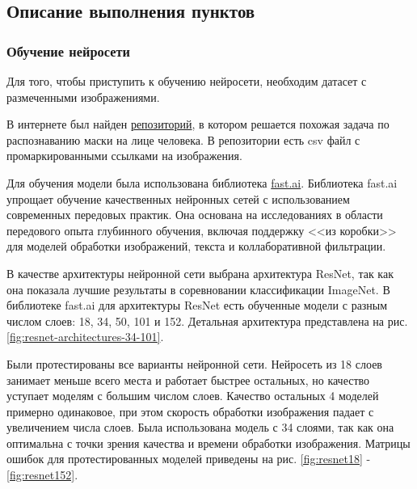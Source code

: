 \documentclass[a4paper,14pt]{article}
\begin{document}



\subsection{Описание выполнения пунктов}

\subsubsection{Обучение нейросети}

Для того, чтобы приступить к обучению нейросети, необходим датасет с размеченными изображениями.

В интернете был найден \href{https://github.com/UniversalDataTool/coronavirus-mask-image-dataset}{репозиторий}, в котором решается похожая задача по распознаванию маски на лице человека.
В репозитории есть csv файл с промаркированными ссылками на изображения.

Для обучения модели была использована библиотека \href{https://docs.fast.ai/}{fast.ai}.
Библиотека fast.ai упрощает обучение качественных нейронных сетей с использованием современных передовых практик.
Она основана на исследованиях в области передового опыта глубинного обучения, включая поддержку <<из коробки>> для моделей обработки изображений, текста и коллаборативной фильтрации.

В качестве архитектуры нейронной сети выбрана архитектура ResNet, так как она показала лучшие результаты в соревновании классификации ImageNet.
В библиотеке fast.ai для архитектуры ResNet есть обученные модели с разным числом слоев: 18, 34, 50, 101 и 152.
Детальная архитектура представлена на рис. \ref{fig:resnet-architectures-34-101}.

Были протестированы все варианты нейронной сети.
Нейросеть из 18 слоев занимает меньше всего места и работает быстрее остальных, но качество уступает моделям с большим числом слоев.
Качество остальных 4 моделей примерно одинаковое, при этом скорость обработки изображения падает с увеличением числа слоев.
Была использована модель с 34 слоями, так как она оптимальна с точки зрения качества и времени обработки изображения.
Матрицы ошибок для протестированных моделей приведены на рис. \ref{fig:resnet18} - \ref{fig:resnet152}.
\end{document}
